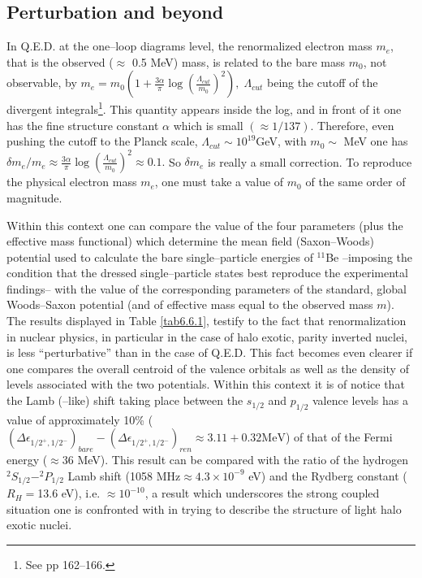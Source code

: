\subsection{Perturbation and beyond}
In Q.E.D. at the one--loop diagrams level, the renormalized electron mass $m_e$, that is the observed ($\approx$ 0.5 MeV) mass, is related to the bare mass $m_0$, not observable, by $m_e=m_0\left(1+\frac{3\alpha}{\pi}\log\left(\frac{\Lambda_{cut}}{m_0}\right)^2\right), \;\Lambda_{cut}$ being the cutoff of the divergent integrals\footnote{See \cite{Bjorken:98} pp 162--166.}. This quantity appears inside the log, and in front of it one has the fine structure constant $\alpha$ which is small $(\approx1/137)$. Therefore, even pushing the cutoff to the Planck scale, $\Lambda_{cut}\sim10^{19}$GeV, with $m_0\sim$ MeV one has $\delta m_e/m_e\approx\frac{3\alpha}{\pi}\log\left(\frac{\Lambda_{cut}}{m_0}\right)^2\approx 0.1.$ So $\delta m_e$ is really a small correction. To reproduce the physical electron mass $m_e$, one must take a value of $m_0$ of the same order of magnitude. 


Within this context one can compare the value of the four parameters (plus the effective mass functional) which determine the mean field (Saxon--Woods) potential used to calculate the bare single--particle energies of $^{11}$Be --imposing the condition that the dressed single--particle states best reproduce the experimental findings-- with the value of the corresponding parameters of the standard, global Woods--Saxon potential (and of effective mass equal to the observed mass $m$). The results displayed in Table \ref{tab6.6.1}, testify to the fact that renormalization in nuclear physics, in particular in the case of halo exotic, parity inverted nuclei, is less ``perturbative'' than in the case of Q.E.D. This fact becomes even clearer if one compares the overall centroid of the valence orbitals as well as the density of levels associated with the two potentials. Within this context it is of notice that the Lamb (--like) shift taking place between the $s_{1/2}$ and $p_{1/2}$ valence levels has a value of approximately 10\% ($(\Delta\epsilon_{1/2^+,1/2^-})_{bare}-(\Delta\epsilon_{1/2^+,1/2^-})_{ren}\approx3.11+0.32\text{MeV}$) of that of the Fermi energy ($\approx36$ MeV). This result can be compared with the ratio of the hydrogen $^2S_{1/2}-^2P_{1/2}$ Lamb shift (1058 MHz$\approx4.3\times10^{-9}$ eV) and the Rydberg constant ($R_H=$13.6 eV), i.e. $\approx10^{-10}$, a result which underscores the strong coupled situation one is confronted with in trying to describe the structure of light halo exotic nuclei.


